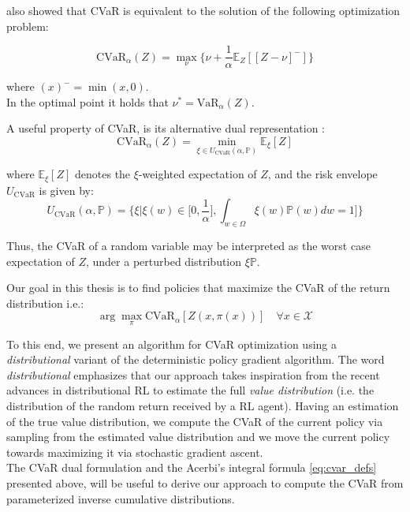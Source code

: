 \citet{Rockafellar2000} also showed that CVaR is equivalent to the solution of
the following optimization problem:

\begin{equation}
    \text{CVaR}_\alpha (Z) = \underset{\nu} \max \big\{\nu + \frac{1}{\alpha} \mathbb E_Z[[Z- \nu]^-]\big\} \label{eq:rockafellar}
\end{equation}

where $(x)^- = \min(x,0)$.\\
In the optimal point it holds that $\nu^*=\text{VaR}_\alpha(Z)$.

A useful property of CVaR, is its alternative dual representation \cite{Artzner1999}:
\begin{equation}
    \text{CVaR}_\alpha (Z) = \underset{\xi \in U_{\text{CVaR}} (\alpha, \mathbb{P})} \min \mathbb E_\xi[Z] \label{eq:dual_cvar}
\end{equation}

where $\mathbb E_\xi[Z]$ denotes the $\xi$-weighted expectation of $Z$, and the risk envelope $U_\text{CVaR}$ is
given by:
\begin{equation}
    U_{\text{CVaR}}(\alpha, \mathbb{P}) = \Big\{\xi | \xi(w)  \in \big [ 0, \frac{1}{\alpha} \big ], \int_{w\in\Omega} \xi(w)\mathbb{P}(w)dw=1   \big ] \Big\}
\end{equation}

Thus, the CVaR of a random variable may be interpreted as the worst case expectation of $Z$, under
a perturbed distribution $\xi \mathbb{P}$.

Our goal in this thesis is to find policies that maximize the CVaR of the 
return distribution i.e.:
\begin{equation}
    \arg \underset{\pi}\max \text{CVaR}_\alpha [Z (x, \pi(x))] \quad \forall x \in \mathcal{X}
\end{equation}

To this end, we present an algorithm for CVaR optimization using a \textit{distributional} variant 
of the deterministic policy gradient algorithm.
The word \textit{distributional} emphasizes that our approach takes inspiration from the
recent advances in distributional RL 
\citep{Bellemare2017,Dabney2018a,Dabney2018b} to estimate the full
\textit{value distribution} (i.e. the distribution of the random return received by a RL agent).
Having an estimation of the true value distribution, we compute the CVaR of the current policy
via sampling from the estimated value distribution and we move the current policy
towards maximizing it via stochastic gradient ascent.\\
The CVaR dual formulation and the Acerbi's integral formula \ref{eq:cvar_defs} presented above,
will be useful to derive our approach to compute the CVaR 
from parameterized inverse cumulative distributions.

